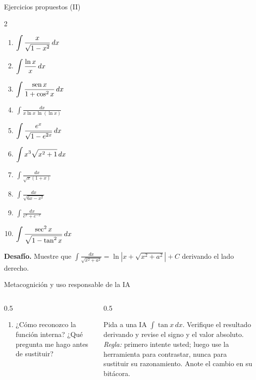\documentclass[10pt,aspectratio=169]{beamer}
\begin{document}
\begin{frame}{Ejercicios propuestos (II)}
  \begin{ejercicio}[: sustitución]
    \begin{multicols}{2}
\begin{enumerate}
          \item $\displaystyle\int\frac{x}{\sqrt{1-x^2}}\,dx$
          \item $\displaystyle\int\frac{\ln x}{x}\,dx$
          \item $\displaystyle\int\frac{\operatorname{sen} x}{1+\cos^2x}\,dx$
          \item $\displaystyle\int\frac{dx}{x\ln x\,\ln(\ln x)}$
          \item $\displaystyle\int\frac{e^x}{\sqrt{1-e^{2x}}}\,dx$
          \item $\displaystyle\int x^3\sqrt{x^2+1}\,dx$
          \item $\displaystyle\int\frac{dx}{\sqrt{x}(1+x)}$
          \item $\displaystyle\int\frac{dx}{\sqrt{6x-x^2}}$
          \item $\displaystyle\int\frac{dx}{e^x+e^{-x}}$
          \item $\displaystyle\int\frac{\sec^2x}{\sqrt{1-\tan^2x}}\,dx$
\end{enumerate}
\end{multicols}
  \end{ejercicio}
  \textbf{Desafío.} Muestre que $\displaystyle\int\frac{dx}{\sqrt{x^2+a^2}}=\ln\left|x+\sqrt{x^2+a^2}\right|+C$ derivando el lado derecho.
\end{frame}

\begin{frame}{Metacognición y uso responsable de la IA}
  \small
  \begin{columns}[t]
    \begin{column}{0.5\textwidth}
      \begin{metacog}
        \begin{enumerate}
          \metacomun
          \item ¿Cómo reconozco la función interna? ¿Qué pregunta me hago antes de sustituir?
        \end{enumerate}
      \end{metacog}
    \end{column}
    \begin{column}{0.5\textwidth}
      \begin{iabox}
        Pida a una IA $\int\tan x\,dx$. Verifique el resultado derivando y revise el signo y el valor absoluto.\\[2pt]
        \textit{Regla:} primero intente usted; luego use la herramienta para contrastar, nunca para sustituir su razonamiento. Anote el cambio en su bitácora.
      \end{iabox}
    \end{column}
  \end{columns}
\end{frame}
\end{document}
